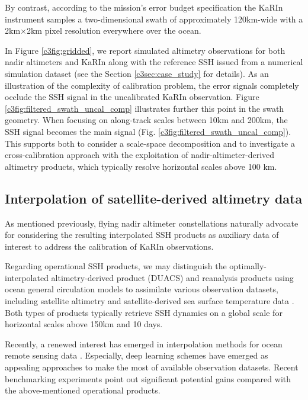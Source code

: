 \begin{bibunit}
By contrast, according to the mission's error budget specification \cite{Peral_Esteban-Fernandez_2018} the KaRIn instrument samples a two-dimensional swath of approximately 120km-wide with a 2km$\times$2km pixel resolution everywhere over the ocean.


In Figure \ref{c3fig:gridded}, we report simulated altimetry observations for both nadir altimeters and KaRIn along with the reference SSH issued from a numerical simulation dataset (see  the Section \ref{c3sec:case_study} for details). As an illustration of the complexity of calibration problem, the error signals completely occlude the SSH signal in the uncalibrated KaRIn observation.
Figure \ref{c3fig:filtered_swath_uncal_comp} illustrates further this point in the swath geometry. When focusing on along-track scales between 10km and 200km, the SSH signal becomes the main signal (Fig. \ref{c3fig:filtered_swath_uncal_comp}). This supports
both to consider a scale-space decomposition and to 
investigate a cross-calibration approach with
the exploitation of nadir-altimeter-derived altimetry products, which typically resolve horizontal scales above 100 km.


\subsection*{Interpolation of satellite-derived altimetry data}
\label{c3subsec:interpolation}

As mentioned previously, flying nadir altimeter constellations naturally advocate for considering the resulting interpolated SSH products as auxiliary data of interest to address the calibration of KaRIn observations. 

Regarding operational SSH products, we may distinguish the optimally-interpolated altimetry-derived product (DUACS) \cite{taburet_duacs_2019} and reanalysis products using ocean general circulation models to assimilate various observation datasets, including satellite altimetry and satellite-derived sea surface temperature data \cite{glorys_rea_2021}. Both types of products typically retrieve SSH dynamics on a global scale for horizontal scales above 150km and 10 days. 

Recently, a renewed interest has emerged in interpolation methods for ocean remote sensing data \cite{beauchamp_intercomparison_2020}\cite{fablet_end2end_2021}. Especially, deep learning schemes have emerged as appealing approaches to make the most of available observation datasets. Recent benchmarking experiments \cite{osse_data_challenge} point out significant potential gains compared with the above-mentioned operational products.


\end{bibunit}
